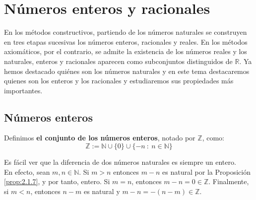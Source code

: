 \chapter{Números enteros y racionales}

En los métodos constructivos, partiendo de los números naturales se construyen en tres etapas sucesivas los números enteros, racionales y reales. En los métodos axiomáticos, por el contrario, se admite la existencia de los números reales y los naturales, enteros y racionales aparecen como subconjuntos distinguidos de $\mathbb{R}$. Ya hemos destacado quiénes son los números naturales y en este tema destacaremos quienes son los enteros y los racionales y estudiaremos sus propiedades más importantes.

    
\section{Números enteros}

\begin{definicion}
    Definimos \textbf{el conjunto de los números enteros}, notado por $\mathbb{Z}$, como:
    \begin{equation*}
        \mathbb{Z} := \mathbb{N} \cup \{0\} \cup \{-n~:~n \in \mathbb{N}\}
    \end{equation*}
\end{definicion}

Es fácil ver que la diferencia de dos números naturales es siempre un entero.\\

En efecto, sean $m,n \in \mathbb{N}$. Si $m > n$ entonces $m-n$ es natural por la Proposición \ref{prop:2.1.7}, y por tanto, entero.
Si $m=n$, entonces  $m-n = 0 \in \mathbb{Z}$. Finalmente, si $m < n$, entonces $n-m$ es natural y $m-n=-(n-m) \in \mathbb{Z}$.\\


